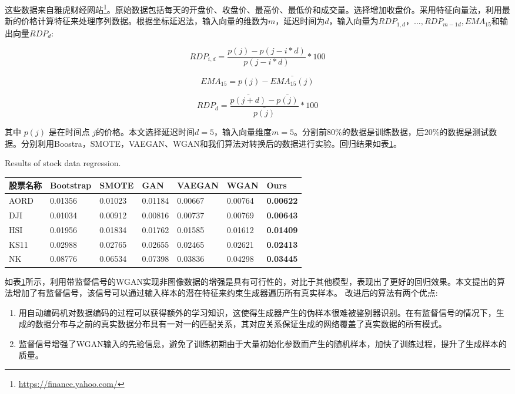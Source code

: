 这些数据来自雅虎财经网站\footnote{\url{https://finance.yahoo.com/}}。原始数据包括每天的开盘价、收盘价、最高价、最低价和成交量。选择增加收盘价。采用特征向量法\cite{18}，利用最新的价格计算特征来处理序列数据。根据坐标延迟法，输入向量的维数为$m$，延迟时间为$d$，输入向量为$RDP_{1,d}，…,RDP_ {m - 1 d}, EMA_{15}$和输出向量$RDP_ {d} $:

\begin{equation}
\label{eq16}
RDP_{i,d} = \frac{p(j)-p(j-i*d)}{p(j-i*d)}*100
\end{equation}


\begin{equation}
\label{eq17}
EMA_{15}  = p(j)-\bar{EMA_{15}(j)}
\end{equation}

\begin{equation}
\label{eq18}
RDP_{d} = \frac{\bar{p(j+d)}-\bar{p(j)}}{\bar{p(j)}}*100
\end{equation}


其中 $p(j)$ 是在时间点 $j$的价格。本文选择延迟时间$d=5$，输入向量维度$m=5$。分割前$80\% $的数据是训练数据，后$20\% $的数据是测试数据。分别利用Boostra，SMOTE，VAEGAN、WGAN和我们算法对转换后的数据进行实验。回归结果如表\ref{tab2}。

\begin{table}[htpb]
	\centering
	{Results of stock data regression.}
	\label{tab2}
	\begin{tabular}{lllllll} \toprule		股票名称&Bootstrap&SMOTE& GAN &  VAEGAN & WGAN &Ours  \\ 
		\midrule
		AORD &0.01356& 0.01023&0.01184 & 0.00667 & 0.00764 &\textbf{0.00622}   \\
		DJI &0.01034&0.00912&0.00816&0.00737&0.00769&\textbf{0.00643}  \\
		HSI &0.01956&0.01834&0.01762&0.01585&0.01612&\textbf{0.01409}  \\
		KS11 &0.02988&0.02765&0.02655&0.02465&0.02621&\textbf{0.02413}\\
		NK  &0.08776&0.06534& 0.07398& 0.03836& 0.04298&\textbf{0.03445} \\
		\bottomrule
	\end{tabular}
\end{table}

如表\ref{tab2}所示，利用带监督信号的WGAN实现非图像数据的增强是具有可行性的，对比于其他模型，表现出了更好的回归效果。本文提出的算法增加了有监督信号，该信号可以通过输入样本的潜在特征来约束生成器遍历所有真实样本。
改进后的算法有两个优点:
\begin{enumerate}
	\item 用自动编码机对数据编码的过程可以获得额外的学习知识，这使得生成器产生的伪样本很难被鉴别器识别。在有监督信号的情况下，生成的数据分布与之前的真实数据分布具有一对一的匹配关系，其对应关系保证生成的网络覆盖了真实数据的所有模式。
	\item 监督信号增强了WGAN输入的先验信息，避免了训练初期由于大量初始化参数而产生的随机样本，加快了训练过程，提升了生成样本的质量。
\end{enumerate}

